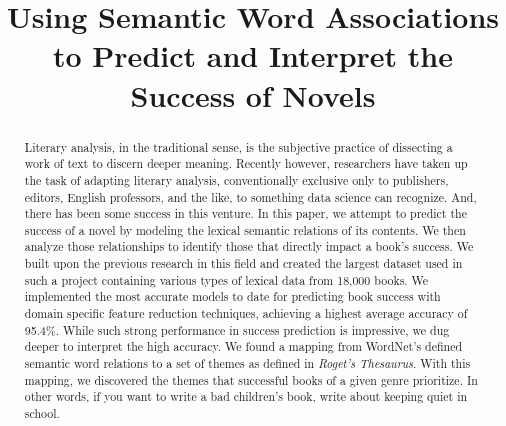 \title[Semantic Success]{Using Semantic Word Associations to Predict and Interpret the Success of Novels}


\begin{abstract}
  Literary analysis, in the traditional sense, is the subjective practice of dissecting a work of text to discern deeper meaning.
  Recently however, researchers have taken up the task of adapting literary analysis, conventionally exclusive only to publishers, editors, English professors, and the like, to something data science can recognize.
  And, there has been some success in this venture.
  In this paper, we attempt to predict the success of a novel by modeling the lexical semantic relations of its contents.
  We then analyze those relationships to identify those that directly impact a book's success. 
  We built upon the previous research in this field and created the largest dataset used in such a project containing various types of lexical data from 18,000 books. 
  We implemented the most accurate models to date for predicting book success with domain specific feature reduction techniques, achieving a highest average accuracy of 95.4\%. 
  While such strong performance in success prediction is impressive, we dug deeper to interpret the high accuracy.
  We found a mapping from WordNet's defined semantic word relations to a set of themes as defined in \textit{Roget's Thesaurus}.
  With this mapping, we discovered the themes that successful books of a given genre prioritize.
  In other words, if you want to write a bad children's book, write about keeping quiet in school.
  
\end{abstract}

